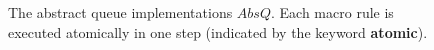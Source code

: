 \begin{figure}[t]
%
%
%
 \vspace{-4mm}
  \caption{The abstract queue implementations $AbsQ$. Each macro rule is executed atomically in one step (indicated by the keyword {\ttfamily \bfseries atomic}).
}
\end{figure}
